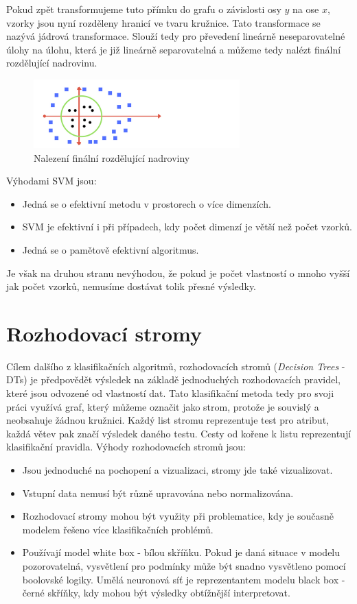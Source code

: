 Pokud zpět transformujeme tuto přímku do grafu o závislosti osy $y$ na ose $x$, vzorky jsou nyní rozděleny hranicí ve tvaru kružnice. Tato transformace se nazývá jádrová transformace. Slouží tedy pro převedení lineárně neseparovatelné úlohy na úlohu, která je již lineárně separovatelná a můžeme tedy nalézt finální rozdělující nadrovinu. \cite{MediumSVM}

\begin{figure}[!htbp]
    \centering
    \includegraphics[width=300px]{obrazky-figures/mediumsvm3.png}
    \caption{Nalezení finální rozdělující nadroviny \cite{MediumSVM}}
\end{figure}

\noindent
Výhodami SVM jsou: \cite{ScikitSVM}
\begin{itemize}
    \item Jedná se o efektivní metodu v prostorech o více dimenzích.
    \item SVM je efektivní i při případech, kdy počet dimenzí je větší než počet vzorků.
    \item Jedná se o pamětově efektivní algoritmus.
\end{itemize}

Je však na druhou stranu nevýhodou, že pokud je počet vlastností o mnoho vyšší jak počet vzorků, nemusíme dostávat tolik přesné výsledky. 

\section{Rozhodovací stromy}
Cílem dalšího z klasifikačních algoritmů, rozhodovacích stromů (\textit{Decision Trees} - DTs) je předpovědět výsledek na základě jednoduchých rozhodovacích pravidel, které jsou odvozené od vlastností dat. Tato klasifikační metoda tedy pro svoji práci využívá graf, který můžeme označit jako strom, protože je souvislý a neobsahuje žádnou kružnici. Každý list stromu reprezentuje test pro atribut, každá větev pak značí výsledek daného testu. Cesty od kořene k listu reprezentují klasifikační pravidla. 
\noindent
Výhody rozhodovacích stromů jsou: \cite{ScikitDTs}
\begin{itemize}
    \item Jsou jednoduché na pochopení a vizualizaci, stromy jde také vizualizovat.
    \item Vstupní data nemusí být různě upravována nebo normalizována.
    \item Rozhodovací stromy mohou být využity při problematice, kdy je současně modelem řešeno více klasifikačních problémů. 
    \item Používají model white box - bílou skříňku. Pokud je daná situace v modelu pozorovatelná, vysvětlení pro podmínky může být snadno vysvětleno pomocí boolovské logiky. Umělá neuronová síť je reprezentantem modelu black box - černé skříňky, kdy mohou být výsledky obtížnější interpretovat. 
\end{itemize}


